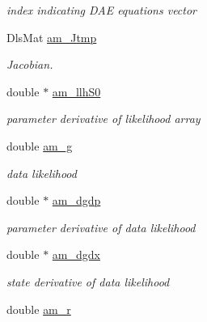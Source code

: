 \begin{DoxyCompactItemize}
\begin{DoxyCompactList}\small\item\em index indicating D\+A\+E equations vector \end{DoxyCompactList}\item 
\hypertarget{struct_temp_data_aa850cd4b6b24d0b98b4aac8f42a057a1}{}Dls\+Mat \hyperlink{struct_temp_data_aa850cd4b6b24d0b98b4aac8f42a057a1}{am\+\_\+\+Jtmp}\label{struct_temp_data_aa850cd4b6b24d0b98b4aac8f42a057a1}

\begin{DoxyCompactList}\small\item\em Jacobian. \end{DoxyCompactList}\item 
\hypertarget{struct_temp_data_a542f10e5df61799d1c7c7d7e6ff18663}{}double $\ast$ \hyperlink{struct_temp_data_a542f10e5df61799d1c7c7d7e6ff18663}{am\+\_\+llh\+S0}\label{struct_temp_data_a542f10e5df61799d1c7c7d7e6ff18663}

\begin{DoxyCompactList}\small\item\em parameter derivative of likelihood array \end{DoxyCompactList}\item 
\hypertarget{struct_temp_data_ae80bd7f1abedcaafe56c6a78384b5542}{}double \hyperlink{struct_temp_data_ae80bd7f1abedcaafe56c6a78384b5542}{am\+\_\+g}\label{struct_temp_data_ae80bd7f1abedcaafe56c6a78384b5542}

\begin{DoxyCompactList}\small\item\em data likelihood \end{DoxyCompactList}\item 
\hypertarget{struct_temp_data_a946de8c8ec9eaf3bae2c3cb5229e5608}{}double $\ast$ \hyperlink{struct_temp_data_a946de8c8ec9eaf3bae2c3cb5229e5608}{am\+\_\+dgdp}\label{struct_temp_data_a946de8c8ec9eaf3bae2c3cb5229e5608}

\begin{DoxyCompactList}\small\item\em parameter derivative of data likelihood \end{DoxyCompactList}\item 
\hypertarget{struct_temp_data_a48ffc7d550f3a08efce20d54ebac8d6a}{}double $\ast$ \hyperlink{struct_temp_data_a48ffc7d550f3a08efce20d54ebac8d6a}{am\+\_\+dgdx}\label{struct_temp_data_a48ffc7d550f3a08efce20d54ebac8d6a}

\begin{DoxyCompactList}\small\item\em state derivative of data likelihood \end{DoxyCompactList}\item 
\hypertarget{struct_temp_data_a7a652bd44d3d6f8ffa106a5295f5e2a1}{}double \hyperlink{struct_temp_data_a7a652bd44d3d6f8ffa106a5295f5e2a1}{am\+\_\+r}\label{struct_temp_data_a7a652bd44d3d6f8ffa106a5295f5e2a1}


\end{DoxyCompactItemize}

